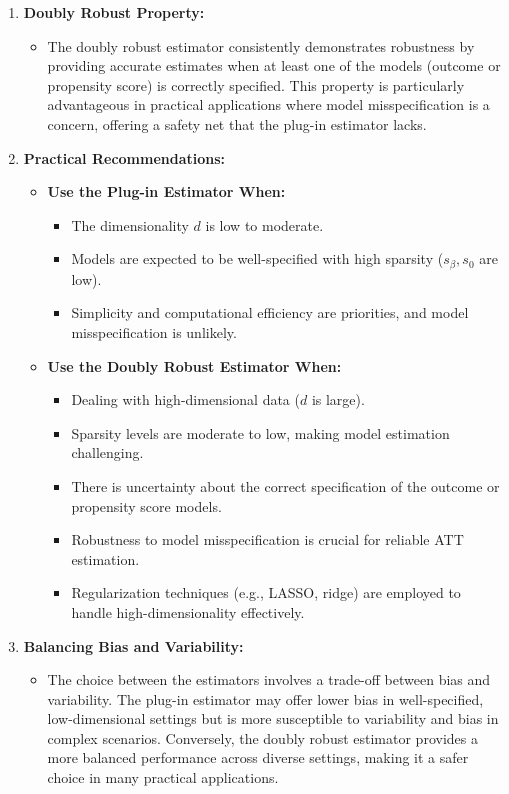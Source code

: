 \documentclass{article}
\begin{document}
\begin{enumerate}
  \item \textbf{Doubly Robust Property:}
    \begin{itemize}
      \item The doubly robust estimator consistently demonstrates robustness by providing accurate estimates when at least one of the models (outcome or propensity score) is correctly specified. This property is particularly advantageous in practical applications where model misspecification is a concern, offering a safety net that the plug-in estimator lacks.
    \end{itemize}

  \item \textbf{Practical Recommendations:}
    \begin{itemize}
      \item \textbf{Use the Plug-in Estimator When:}
        \begin{itemize}
          \item The dimensionality \( d \) is low to moderate.
          \item Models are expected to be well-specified with high sparsity (\( s_\beta, s_0 \) are low).
          \item Simplicity and computational efficiency are priorities, and model misspecification is unlikely.
        \end{itemize}
      \item \textbf{Use the Doubly Robust Estimator When:}
        \begin{itemize}
          \item Dealing with high-dimensional data (\( d \) is large).
          \item Sparsity levels are moderate to low, making model estimation challenging.
          \item There is uncertainty about the correct specification of the outcome or propensity score models.
          \item Robustness to model misspecification is crucial for reliable ATT estimation.
          \item Regularization techniques (e.g., LASSO, ridge) are employed to handle high-dimensionality effectively.
        \end{itemize}
    \end{itemize}

  \item \textbf{Balancing Bias and Variability:}
    \begin{itemize}
      \item The choice between the estimators involves a trade-off between bias and variability. The plug-in estimator may offer lower bias in well-specified, low-dimensional settings but is more susceptible to variability and bias in complex scenarios. Conversely, the doubly robust estimator provides a more balanced performance across diverse settings, making it a safer choice in many practical applications.
    \end{itemize}
\end{enumerate}
\end{document}

